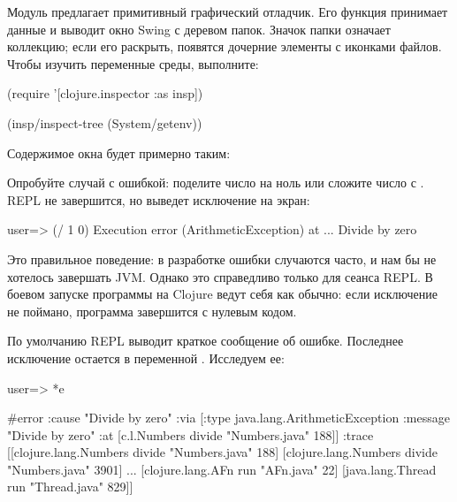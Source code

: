 Модуль  предлагает примитивный графический отладчик. Его функция  принимает данные и выводит окно Swing с деревом папок. Значок папки означает коллекцию; если его раскрыть, появятся дочерние элементы с иконками файлов. Чтобы изучить переменные среды, выполните:

\begin{english}
  \begin{clojure}
(require '[clojure.inspector :as insp])

(insp/inspect-tree (System/getenv))
  \end{clojure}
\end{english}

Содержимое окна будет примерно таким:

\vspace{3mm}


\vspace{3mm}

Опробуйте случай с ошибкой: поделите число на ноль или сложите число с . REPL не завершится, но выведет исключение на экран:

\begin{english}
  \begin{clojure}
user=> (/ 1 0)
Execution error (ArithmeticException) at ...
Divide by zero
  \end{clojure}
\end{english}

Это правильное поведение: в разработке ошибки случаются часто, и нам бы не хотелось завершать JVM. Однако это справедливо только для сеанса REPL. В боевом запуске программы на Clojure ведут себя как обычно: если исключение не поймано, программа завершится с нулевым кодом.

По умолчанию REPL выводит краткое сообщение об ошибке. Последнее исключение остается в переменной . Исследуем ее:

\begin{english}
  \begin{clojure}
user=> *e

#error {
 :cause "Divide by zero"
 :via
 [{:type java.lang.ArithmeticException
   :message "Divide by zero"
   :at [c.l.Numbers divide "Numbers.java" 188]}]
 :trace
 [[clojure.lang.Numbers divide "Numbers.java" 188]
  [clojure.lang.Numbers divide "Numbers.java" 3901]
  ...
  [clojure.lang.AFn run "AFn.java" 22]
  [java.lang.Thread run "Thread.java" 829]]}
  \end{clojure}
\end{english}


